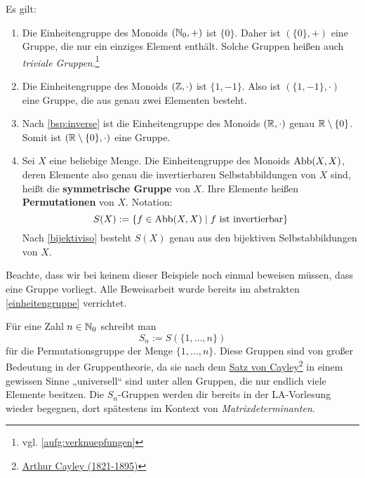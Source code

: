 \begin{bsp}  
    Es gilt:
    \begin{enumerate}
        \item Die Einheitengruppe des Monoids $(\mathbb N_0,+)$ ist $\{0\}$. Daher ist $(\{0\},+)$ eine Gruppe, die nur ein einziges Element enthält. Solche Gruppen heißen auch \emph{triviale Gruppen}.\footnote{vgl. \cref{aufg:verknuepfungen}}
        \item Die Einheitengruppe des Monoids $(\mathbb Z,\cdot)$ ist $\{1,-1\}$. Also ist $(\{1,-1\},\cdot)$ eine Gruppe, die aus genau zwei Elementen besteht.
        \item Nach \cref{bsp:inverse} ist die Einheitengruppe des Monoids $(\mathbb R,\cdot)$ genau $\mathbb R\setminus \{0\}$. Somit ist $(\mathbb R\setminus \{0\},\cdot)$ eine Gruppe.
        \item Sei $X$ eine beliebige Menge. Die Einheitengruppe des Monoids $\operatorname{Abb}(X,X)$, deren Elemente also genau die invertierbaren Selbstabbildungen von $X$ sind, heißt die \textbf{symmetrische Gruppe} von $X$. Ihre Elemente heißen \textbf{Permutationen} von $X$. Notation:
            \[ S(X) := \{f\in \Abb(X,X)\mid f\ \text{ist invertierbar} \} \]
        Nach \cref{bijektiviso} besteht $S(X)$ genau aus den bijektiven Selbstabbildungen von $X$.
    \end{enumerate}
    Beachte, dass wir bei keinem dieser Beispiele noch einmal beweisen müssen, dass eine Gruppe vorliegt. Alle Beweisarbeit wurde bereits im abstrakten \cref{einheitengruppe} verrichtet.
\end{bsp}


\begin{bem}
    Für eine Zahl $n\in \mathbb N_0$ schreibt man
        \[ S_n := S(\{1,\dots , n\}) \]
    für die Permutationsgruppe der Menge $\{1,\dots , n\}$. Diese Gruppen sind von großer Bedeutung in der Gruppentheorie, da sie nach dem \href{https://de.wikipedia.org/wiki/Satz_von_Cayley}{Satz von Cayley}\footnote{\href{https://de.wikipedia.org/wiki/Arthur_Cayley}{Arthur Cayley (1821-1895)}} in einem gewissen Sinne „universell“ sind unter allen Gruppen, die nur endlich viele Elemente besitzen. Die $S_n$-Gruppen werden dir bereits in der LA-Vorlesung wieder begegnen, dort spätestens im Kontext von \emph{Matrixdeterminanten}.
\end{bem}


